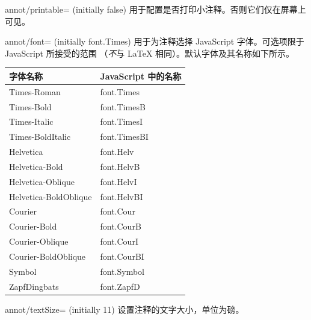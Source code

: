 \begin{pgfplotskey}{annot/printable= (initially false)}
    用于配置是否打印小注释。否则它们仅在屏幕上可见。
\end{pgfplotskey}

\begin{pgfplotskey}{annot/font= (initially font.Times)}
    用于为注释选择 JavaScript 字体。可选项限于 JavaScript 所接受的范围
    （\emph{不}与 \LaTeX{} 相同）。默认字体及其名称如下所示。

    \begin{center}
        \begin{tabular}{ll}
                \toprule
            字体名称             & JavaScript 中的名称 \\
                \midrule
            Times-Roman           & font.Times         \\
            Times-Bold            & font.TimesB        \\
            Times-Italic          & font.TimesI        \\
            Times-BoldItalic      & font.TimesBI       \\
            Helvetica             & font.Helv          \\
            Helvetica-Bold        & font.HelvB         \\
            Helvetica-Oblique     & font.HelvI         \\
            Helvetica-BoldOblique & font.HelvBI        \\
            Courier               & font.Cour          \\
            Courier-Bold          & font.CourB         \\
            Courier-Oblique       & font.CourI         \\
            Courier-BoldOblique   & font.CourBI        \\
            Symbol                & font.Symbol        \\
            ZapfDingbats          & font.ZapfD         \\
                \bottomrule
        \end{tabular}
    \end{center}
\end{pgfplotskey}

\begin{pgfplotskey}{annot/textSize= (initially 11)}
    设置注释的文字大小，单位为磅。
\end{pgfplotskey}

